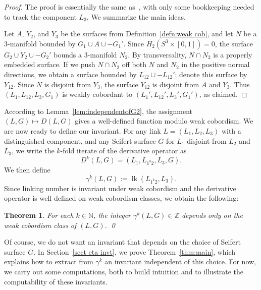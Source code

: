 \documentclass[a4paper, 11pt]{amsart}
\newtheorem{theorem}{Theorem}[section]
\theoremstyle{definition}
\newcommand{\N}{\mathbb{N}}
\newcommand{\Z}{\mathbb{Z}}
\newcommand{\lk}{\operatorname{lk}}
\begin{document}
\begin{proof}
The proof is essentially the same as~\cite[Theorem~4.2]{C3}, with only some bookkeeping needed to track the component $L_3$. We summarize the main ideas.

Let $A$, $Y_2$, and $Y_3$ be the surfaces from Definition~\ref{defn:weak cob}, and let $N$ be a $3$-manifold bounded by $G_1\cup A\cup -G_1'$. Since $H_2(S^3\times[0,1])=0$, the surface $G_2\cup Y_2\cup -G_2'$ bounds a $3$-manifold $N_2$. By transversality, $N\cap N_2$ is a properly embedded surface. If we push $N\cap N_2$ off both $N$ and $N_2$ in the positive normal directions, we obtain a surface bounded by $L_{12}\cup -L_{12}'$; denote this surface by $Y_{12}$. Since $N$ is disjoint from $Y_3$, the surface $Y_{12}$ is disjoint from $A$ and $Y_3$. Thus $(L_1, L_{12}, L_3, G_1)$ is weakly cobordant to $(L_1', L_{12}', L_3', G_1')$, as claimed.
\end{proof}


According to Lemma~\ref{lem:independentofG2}, the assignment $(L,G)\mapsto D(L,G)$ gives a well-defined function modulo weak cobordism. We are now ready to define our invariant. For any link $L=(L_1,L_2,L_3)$ with a distinguished component, and any Seifert surface $G$ for $L_1$ disjoint from $L_2$ and $L_3$, we write the $k$-fold iterate of the derivative operator as
\[
D^k(L,G)=(L_1,L_{1^k2},L_3,G).
\]
We then define
\[
\gamma^k(L,G):=\lk(L_{1^k2},L_3).
\]
Since linking number is invariant under weak cobordism and the derivative operator is well defined on weak cobordism classes, we obtain the following:

\begin{theorem}\label{thm: gamma is invt of weak cob with surface}
For each $k\in \N$, the integer $\gamma^k(L,G)\in \Z$ depends only on the weak cobordism class of $(L,G)$. \qed
\end{theorem}

Of course, we do not want an invariant that depends on the choice of Seifert surface $G$. In Section~\ref{sect eta invt}, we prove Theorem~\ref{thm:main}, which explains how to extract from $\gamma^k$  an invariant independent of this choice. For now, we carry out some computations, both to build intuition and to illustrate the computability of these invariants.


\end{document}
